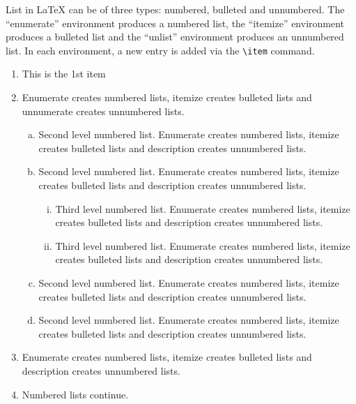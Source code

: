 \documentclass[unnumsec,webpdf,contemporary,large]{oup-authoring-template}%
\theoremstyle{thmstyleone}%
\theoremstyle{thmstyletwo}%
\theoremstyle{thmstylethree}%
\begin{document}
List in \LaTeX{} can be of three types: numbered, bulleted and unnumbered. The ``enumerate'' environment produces a numbered list, the
``itemize'' environment produces a bulleted list and the ``unlist''
environment produces an unnumbered list.
In each environment, a new entry is added via the \verb+\item+ command.
\begin{enumerate}[1.]
	\item This is the 1st item

	\item Enumerate creates numbered lists, itemize creates bulleted lists and
	      unnumerate creates unnumbered lists.
	      \begin{enumerate}[(a)]
		      \item Second level numbered list. Enumerate creates numbered lists, itemize creates bulleted lists and
		            description creates unnumbered lists.

		      \item Second level numbered list. Enumerate creates numbered lists, itemize creates bulleted lists and
		            description creates unnumbered lists.
		            \begin{enumerate}[(ii)]
			            \item Third level numbered list. Enumerate creates numbered lists, itemize creates bulleted lists and
			                  description creates unnumbered lists.

			            \item Third level numbered list. Enumerate creates numbered lists, itemize creates bulleted lists and
			                  description creates unnumbered lists.
		            \end{enumerate}

		      \item Second level numbered list. Enumerate creates numbered lists, itemize creates bulleted lists and
		            description creates unnumbered lists.

		      \item Second level numbered list. Enumerate creates numbered lists, itemize creates bulleted lists and
		            description creates unnumbered lists.
	      \end{enumerate}

	\item Enumerate creates numbered lists, itemize creates bulleted lists and
	      description creates unnumbered lists.

	\item Numbered lists continue.
\end{enumerate}
\end{document}
